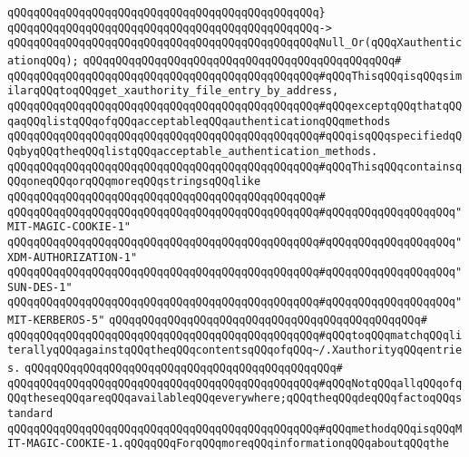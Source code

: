 \verb|qQQqqQQqqQQqqQQqqQQqqQQqqQQqqQQqqQQqqQQqqQQqqQQq}|\newline
\verb|qQQqqQQqqQQqqQQqqQQqqQQqqQQqqQQqqQQqqQQqqQQqqQQq->|\newline
\verb|qQQqqQQqqQQqqQQqqQQqqQQqqQQqqQQqqQQqqQQqqQQqqQQqNull_Or(qQQqXauthenticationqQQq);|\newline
\verb|qQQqqQQqqQQqqQQqqQQqqQQqqQQqqQQqqQQqqQQqqQQqqQQq#|\newline
\verb|qQQqqQQqqQQqqQQqqQQqqQQqqQQqqQQqqQQqqQQqqQQqqQQq#qQQqThisqQQqisqQQqsimilarqQQqtoqQQqget_xauthority_file_entry_by_address,|\newline
\verb|qQQqqQQqqQQqqQQqqQQqqQQqqQQqqQQqqQQqqQQqqQQqqQQq#qQQqexceptqQQqthatqQQqaqQQqlistqQQqofqQQqacceptableqQQqauthenticationqQQqmethods|\newline
\verb|qQQqqQQqqQQqqQQqqQQqqQQqqQQqqQQqqQQqqQQqqQQqqQQq#qQQqisqQQqspecifiedqQQqbyqQQqtheqQQqlistqQQqacceptable_authentication_methods.|\newline
\verb|qQQqqQQqqQQqqQQqqQQqqQQqqQQqqQQqqQQqqQQqqQQqqQQq#qQQqThisqQQqcontainsqQQqoneqQQqorqQQqmoreqQQqstringsqQQqlike|\newline
\verb|qQQqqQQqqQQqqQQqqQQqqQQqqQQqqQQqqQQqqQQqqQQqqQQq#|\newline
\verb|qQQqqQQqqQQqqQQqqQQqqQQqqQQqqQQqqQQqqQQqqQQqqQQq#qQQqqQQqqQQqqQQqqQQq"MIT-MAGIC-COOKIE-1"|\newline
\verb|qQQqqQQqqQQqqQQqqQQqqQQqqQQqqQQqqQQqqQQqqQQqqQQq#qQQqqQQqqQQqqQQqqQQq"XDM-AUTHORIZATION-1"|\newline
\verb|qQQqqQQqqQQqqQQqqQQqqQQqqQQqqQQqqQQqqQQqqQQqqQQq#qQQqqQQqqQQqqQQqqQQq"SUN-DES-1"|\newline
\verb|qQQqqQQqqQQqqQQqqQQqqQQqqQQqqQQqqQQqqQQqqQQqqQQq#qQQqqQQqqQQqqQQqqQQq"MIT-KERBEROS-5"|\newline
\verb|qQQqqQQqqQQqqQQqqQQqqQQqqQQqqQQqqQQqqQQqqQQqqQQq#|\newline
\verb|qQQqqQQqqQQqqQQqqQQqqQQqqQQqqQQqqQQqqQQqqQQqqQQq#qQQqtoqQQqmatchqQQqliterallyqQQqagainstqQQqtheqQQqcontentsqQQqofqQQq~/.XauthorityqQQqentries.|\newline
\verb|qQQqqQQqqQQqqQQqqQQqqQQqqQQqqQQqqQQqqQQqqQQqqQQq#|\newline
\verb|qQQqqQQqqQQqqQQqqQQqqQQqqQQqqQQqqQQqqQQqqQQqqQQq#qQQqNotqQQqallqQQqofqQQqtheseqQQqareqQQqavailableqQQqeverywhere;qQQqtheqQQqdeqQQqfactoqQQqstandard|\newline
\verb|qQQqqQQqqQQqqQQqqQQqqQQqqQQqqQQqqQQqqQQqqQQqqQQq#qQQqmethodqQQqisqQQqMIT-MAGIC-COOKIE-1.qQQqqQQqForqQQqmoreqQQqinformationqQQqaboutqQQqthe|\newline
